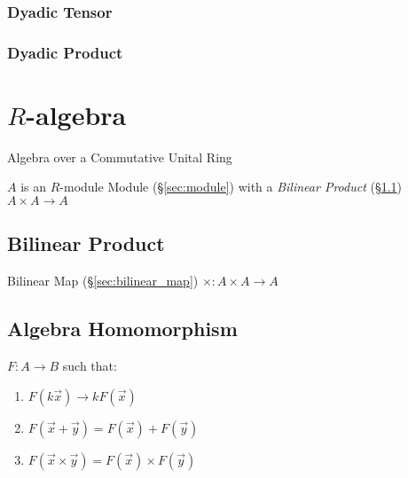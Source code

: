 {{\subsubsection{Dyadic Tensor}\label{sec:dyadic_tensor}

\subsubsection{Dyadic Product}\label{sec:dyadic_product}



\section{$R$-algebra}\label{sec:r_algebra}

Algebra over a Commutative Unital Ring

$A$ is an $R$-module Module (\S\ref{sec:module}) with a \emph{Bilinear Product}
(\S\ref{sec:bilinear_product}) $A \times A \rightarrow A$




\subsection{Bilinear Product}\label{sec:bilinear_product}

Bilinear Map (\S\ref{sec:bilinear_map}) $\times : A \times A \rightarrow A$



\subsection{Algebra Homomorphism}\label{sec:algebra_homomorphism}

$F : A \rightarrow B$ such that:
\begin{enumerate}
  \item $F(k\vec{x}) \rightarrow kF(\vec{x})$
  \item $F(\vec{x} + \vec{y}) = F(\vec{x}) + F(\vec{y})$
  \item $F(\vec{x} \times \vec{y}) = F(\vec{x}) \times F(\vec{y})$
\end{enumerate}

}}
